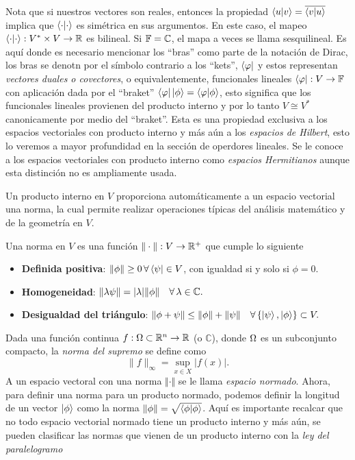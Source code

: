 \documentclass[main.tex]{subfiles}
\begin{document}
Nota que si nuestros vectores son reales, entonces la propiedad \(\braket{u|v} = \overline{\braket{v|u}}\) implica que \(\braket{\cdot|\cdot}\) es simétrica en sus argumentos. En este caso, el mapeo \(\braket{\cdot|\cdot}: V^{*} \times V \to \mathbb R \) es bilineal. Si \(\mathbb{F} = \mathbb C \), el mapa a veces se llama sesquilineal. Es aquí donde es necesario mencionar los ``bras'' como parte de la notación de Dirac, los bras se denotn por el símbolo contrario a los ``kets'', $\bra{\varphi}$ y estos representan \emph{vectores duales o covectores}, o equivalentemente, funcionales lineales \hbox{$\bra{\varphi}:V\rightarrow\mathbb{F}$} con aplicación dada por el ``braket'' $\bra{\varphi}\ket{\phi}=\braket{\varphi|\phi}$, esto significa que los funcionales lineales provienen del producto interno y por lo tanto $V\cong V^{*}$ canonicamente por medio del ``braket''. Esta es una propiedad exclusiva a los espacios vectoriales con producto interno y más aún a los \emph{espacios de Hilbert}, esto lo veremos a mayor profundidad en la sección de operdores lineales. Se le conoce a los espacios vectoriales con producto interno como \emph{espacios Hermitianos} aunque esta distinción no es ampliamente usada.

Un producto interno en \(V\) proporciona automáticamente a un espacio vectorial una norma, la cual permite realizar operaciones típicas del análisis matemático y de la geometría en \(V\).
\begin{def.}
Una norma en \(V\) es una función \(\Vert\cdot\Vert:V\rightarrow\mathbb R ^{+}\) que cumple lo siguiente
\begin{itemize}
    \item \textbf{Definida positiva}: \(\Vert\phi\Vert \geq 0\,\forall \bra{\psi} \in V\), con igualdad si y solo si \(\phi = 0\).
    \item \textbf{Homogeneidad}: \(\Vert \lambda \psi\Vert = |\lambda|\Vert\phi\Vert\quad\forall\,\lambda\in\mathbb C .\)
    \item \textbf{Desigualdad del triángulo}: \(\Vert \phi + \psi\Vert \leq \Vert\phi\Vert + \Vert\psi\Vert\quad\forall\,\{\ket{\psi},\ket{\phi}\}\subset V.\)
\end{itemize}
\end{def.}
\eje Dada una función continua \(f: \Omega\subset\mathbb R ^n \to \mathbb{R}\) (o \(\mathbb{C}\)), donde \(\Omega\) es un subconjunto compacto, la \emph{norma del supremo} se define como
    \[
    \|f\|_\infty = \sup_{x \in X} |f(x)|.
    \]
A un espacio vectoral con una norma \(\Vert\cdot\Vert\) se le llama \emph{espacio normado}. Ahora, para definir una norma para un producto normado, podemos definir la longitud de un vector \(\ket{\phi}\) como la norma \(\Vert\phi\Vert=\sqrt{\braket{\phi|\phi}}\). Aquí es importante recalcar que no todo espacio vectorial normado tiene un producto interno y más aún, se pueden clasificar las normas que vienen de un producto interno con la \emph{ley del paralelogramo}
\end{document}
